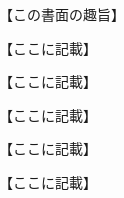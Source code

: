\documentclass{ltjsarticle}
\begin{document}
\maketitle

\SecZ{}

【この書面の趣旨】

 \SecZ{}


\SecA{}

【ここに記載】

\SecB{}

【ここに記載】

\SecB{}

【ここに記載】

\SecB{}

【ここに記載】

\SecC{}

【ここに記載】

\Ijo
\end{document}
